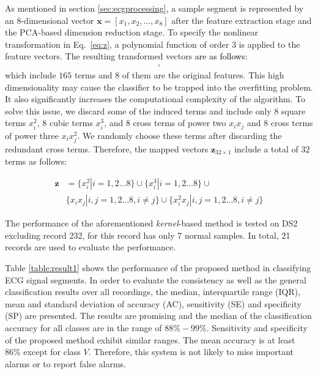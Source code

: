 As mentioned in section \ref{sec:ecgprocessing}, a sample segment is represented by an 8-dimensional vector $\mathbf{x}=[x_1,x_2,\dots,x_8]$ after the feature extraction stage and the PCA-based dimension reduction stage. %
To specify the nonlinear transformation in Eq.~\ref{eq:z}, a polynomial function of order $3$ is applied to the feature vectors.
The resulting transformed vectors \textcolor{black}{are as follows:}
\begin{align}
	[x_1,x_2,\dots,x_8,x_1^2,x_2^2,\dots,x_8^2,x_1^3,x_2^3,\dots,x_8^3,x_1x_2,....x_6x_7x_8], 
\end{align}
which include $165$ terms and 8 of them are the original features. %
This high dimensionality may cause the classifier to be trapped into the overfitting problem. It also significantly increases the computational complexity of the algorithm. To solve this issue, we discard some of the induced terms and include only 8 square terms $x_i^2$, 8 cubic terms $x_i^3$, and 8 cross terms of power two $x_ix_j$ and 8 cross terms of power three $x_i x_j^2$. We randomly choose these terms after discarding the redundant cross terms. Therefore, the mapped vectors $\mathbf{z}_{32 \times 1}$ include a total of $32$ terms as follows:

\begin{align}
\label{eq:8-32}
\mathbf{z}&=\{x_i^2|i=1,2\dots 8\}\cup\{x_i^3|i=1,2\dots 8\} \cup\\
\nonumber
& \{x_ix_j|i,j=1,2\dots 8,i\neq j\} \cup  \{  x_i^2x_j | i,j=1,2\dots 8,i\neq j \}
\end{align}

The performance of the aforementioned \textit{kernel}-based method is tested on DS2 excluding record 232, for this record has only 7 normal samples. In total, 21 records are used to evaluate the performance.

Table \ref{table:result1} shows the performance of the proposed method in classifying ECG signal segments. In order to evaluate the consistency as well as the general classification results over all recordings, the median, interquartile range (IQR), mean and standard deviation of accuracy (AC), sensitivity (SE) and specificity (SP) are presented. The results are promising and the median of the classification accuracy for all classes are in the range of $88\%-99\%$. Sensitivity and specificity of the proposed method exhibit similar ranges. The mean accuracy is at least $86\%$ except for class $V$. Therefore, this system is not likely to miss important alarms or to report false alarms. 

